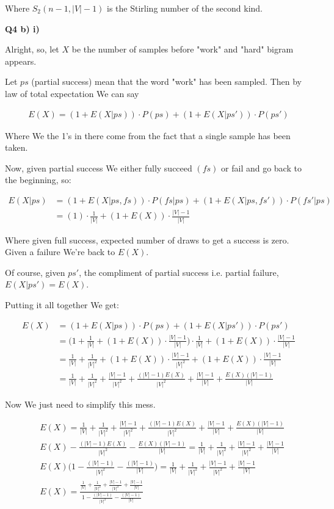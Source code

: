 \documentclass{article}
\begin{document}
	Where $S_2(n-1, |V|-1)$ is the Stirling number of the second kind. 
	
\textbf{Q4 b) i)}

	Alright, so, let $X$ be the number of samples before "work" and "hard" bigram appears.
	
	Let $ps$ (partial success) mean that the word "work" has been sampled. Then by law of total expectation We can say
	
	\begin{align}
		E(X) = (1+E(X|ps))\cdot P(ps) + (1+E(X|ps'))\cdot P(ps')
	\end{align}
	
	Where We the 1's in there come from the fact that a single sample has been taken.
	
	Now, given partial success We either fully succeed $(fs)$ or fail and go back to the beginning, so:
	
	\begin{align}
		E(X|ps) &= (1+E(X|ps, fs))\cdot P(fs|ps) + (1+E(X|ps, fs'))\cdot P(fs'|ps)\\
		&= (1)\cdot \frac{1}{|V|} + (1+E(X))\cdot \frac{|V|-1}{|V|}
	\end{align}
	
	Where given full success, expected number of draws to get a success is zero.  Given a failure We're back to $E(X)$.
	
	Of course, given $ps'$, the compliment of partial success i.e. partial failure, $E(X|ps') = E(X)$.
	
	Putting it all together We get:
	
	\begin{align}
		E(X) &= (1+E(X|ps))\cdot P(ps) + (1+E(X|ps'))\cdot P(ps')\\
		&= \bigg(1+\frac{1}{|V|} + (1+E(X))\cdot \frac{|V|-1}{|V|}\bigg)\cdot \frac{1}{|V|} + (1+E(X))\cdot \frac{|V| - 1}{|V|}\\
		&= \frac{1}{|V|}+\frac{1}{|V|^2} + (1+E(X))\cdot \frac{|V|-1}{|V|^2} + (1+E(X))\cdot \frac{|V|-1}{|V|}\\
		&= \frac{1}{|V|}+\frac{1}{|V|^2} + \frac{|V|-1}{|V|^2} + \frac{(|V|-1)E(X)}{|V|^2} + \frac{|V|-1}{|V|}+\frac{E(X)(|V|-1)}{|V|}
	\end{align}
	
	Now We just need to simplify this mess.
	
	\begin{align}
		&E(X) = \frac{1}{|V|}+\frac{1}{|V|^2} + \frac{|V|-1}{|V|^2} + \frac{(|V|-1)E(X)}{|V|^2} + \frac{|V|-1}{|V|}+\frac{E(X)(|V|-1)}{|V|}\\
		&E(X) - \frac{(|V|-1)E(X)}{|V|^2}-\frac{E(X)(|V|-1)}{|V|} = \frac{1}{|V|}+\frac{1}{|V|^2} + \frac{|V|-1}{|V|^2}  + \frac{|V|-1}{|V|}\\
		&E(X)\bigg(1 - \frac{(|V|-1)}{|V|^2}-\frac{(|V|-1)}{|V|}\bigg) = \frac{1}{|V|}+\frac{1}{|V|^2} + \frac{|V|-1}{|V|^2}  + \frac{|V|-1}{|V|}\\
		&E(X) = \frac{\frac{1}{|V|}+\frac{1}{|V|^2} + \frac{|V|-1}{|V|^2}  + \frac{|V|-1}{|V|}}{1 - \frac{(|V|-1)}{|V|^2}-\frac{(|V|-1)}{|V|}}
	\end{align}
	
\end{document}
